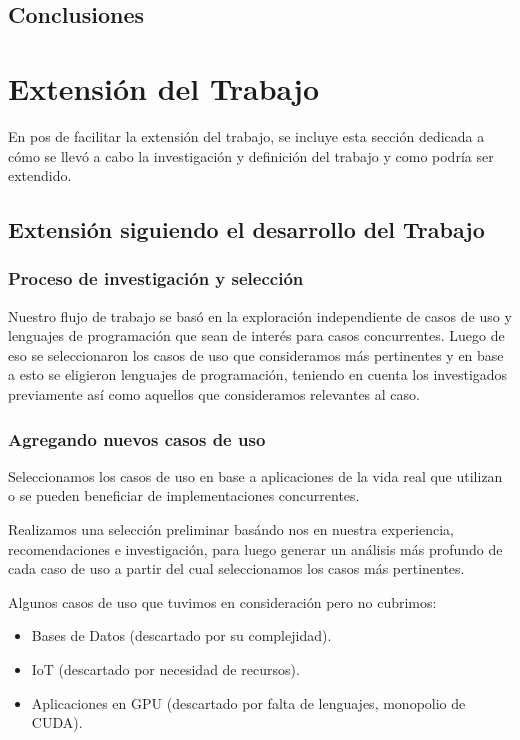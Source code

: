 \documentclass[11pt]{article}
\let\Oldsection\section
\renewcommand{\section}{\FloatBarrier\Oldsection}
\let\Oldsubsection\subsection
\renewcommand{\subsection}{\FloatBarrier\Oldsubsection}
\let\Oldsubsubsection\subsubsection
\renewcommand{\subsubsection}{\FloatBarrier\Oldsubsubsection}
\begin{document}
\subsection{Conclusiones}


\section{Extensión del Trabajo}

En pos de facilitar la extensión del trabajo, se incluye esta sección dedicada a cómo se llevó a cabo la investigación y definición del trabajo y como podría ser extendido.

\subsection{Extensión siguiendo el desarrollo del Trabajo}

\subsubsection{Proceso de investigación y selección}

Nuestro flujo de trabajo se basó en la exploración independiente de casos de uso y lenguajes de programación que sean de interés para casos concurrentes.
Luego de eso se seleccionaron los casos de uso que consideramos más pertinentes y en base a esto se eligieron lenguajes de programación, teniendo en cuenta los investigados previamente así como aquellos que consideramos relevantes al caso.

\subsubsection{Agregando nuevos casos de uso}

Seleccionamos los casos de uso en base a aplicaciones de la vida real que utilizan o se pueden beneficiar de implementaciones concurrentes.

Realizamos una selección preliminar basándo nos en nuestra experiencia, recomendaciones e investigación, para luego generar un análisis más profundo de cada caso de uso a partir del cual seleccionamos los casos más pertinentes.

Algunos casos de uso que tuvimos en consideración pero no cubrimos:

\begin{itemize}
    \item Bases de Datos (descartado por su complejidad).
    \item IoT (descartado por necesidad de recursos).
    \item Aplicaciones en GPU (descartado por falta de lenguajes, monopolio de CUDA).
\end{itemize}
\end{document}
